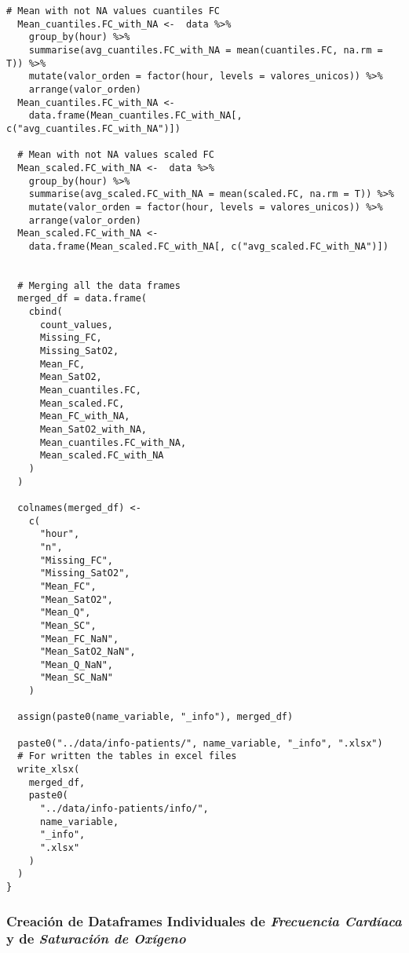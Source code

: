 \begin{lstlisting}[style=mystyle,caption={Cálculo de Medias y Cantidad de Valores Faltantes}, label={lst:medias-y-faltantes}]
  # Mean with not NA values cuantiles FC
  Mean_cuantiles.FC_with_NA <-  data %>%
    group_by(hour) %>%
    summarise(avg_cuantiles.FC_with_NA = mean(cuantiles.FC, na.rm = T)) %>%
    mutate(valor_orden = factor(hour, levels = valores_unicos)) %>%
    arrange(valor_orden)
  Mean_cuantiles.FC_with_NA <-
    data.frame(Mean_cuantiles.FC_with_NA[, c("avg_cuantiles.FC_with_NA")])
  
  # Mean with not NA values scaled FC
  Mean_scaled.FC_with_NA <-  data %>%
    group_by(hour) %>%
    summarise(avg_scaled.FC_with_NA = mean(scaled.FC, na.rm = T)) %>%
    mutate(valor_orden = factor(hour, levels = valores_unicos)) %>%
    arrange(valor_orden)
  Mean_scaled.FC_with_NA <-
    data.frame(Mean_scaled.FC_with_NA[, c("avg_scaled.FC_with_NA")])
  
  
  # Merging all the data frames
  merged_df = data.frame(
    cbind(
      count_values,
      Missing_FC,
      Missing_SatO2,
      Mean_FC,
      Mean_SatO2,
      Mean_cuantiles.FC,
      Mean_scaled.FC,
      Mean_FC_with_NA,
      Mean_SatO2_with_NA,
      Mean_cuantiles.FC_with_NA,
      Mean_scaled.FC_with_NA
    )
  )
  
  colnames(merged_df) <-
    c(
      "hour",
      "n",
      "Missing_FC",
      "Missing_SatO2",
      "Mean_FC",
      "Mean_SatO2",
      "Mean_Q",
      "Mean_SC",
      "Mean_FC_NaN",
      "Mean_SatO2_NaN",
      "Mean_Q_NaN",
      "Mean_SC_NaN"
    )
  
  assign(paste0(name_variable, "_info"), merged_df)
  
  paste0("../data/info-patients/", name_variable, "_info", ".xlsx")
  # For written the tables in excel files
  write_xlsx(
    merged_df,
    paste0(
      "../data/info-patients/info/",
      name_variable,
      "_info",
      ".xlsx"
    )
  )
}
\end{lstlisting}


\subsubsection{Creación de Dataframes Individuales de \textit{Frecuencia Cardíaca} y de \textit{Saturación de Oxígeno} }~\label{sec:anexo2-dataframes}

